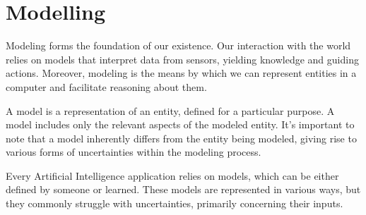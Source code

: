 \section{Modelling}

Modeling forms the foundation of our existence. Our interaction with the world relies on models that interpret data from sensors, yielding knowledge and guiding actions. 
Moreover, modeling is the means by which we can represent entities in a computer and facilitate reasoning about them.
\begin{definition}
    A model is a representation of an entity, defined for a particular purpose. A model includes only the relevant aspects of the modeled entity. 
    It's important to note that a model inherently differs from the entity being modeled, giving rise to various forms of uncertainties within the modeling process.
\end{definition}
Every Artificial Intelligence application relies on models, which can be either defined by someone or learned. These models are represented in various ways, but they commonly struggle with uncertainties, primarily concerning their inputs.